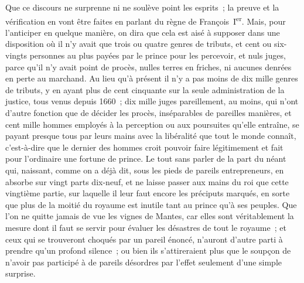 \documentclass[french,twoside]{book} %
\begin{document}
Que ce discours ne surprenne ni ne soulève point les esprits ; la preuve et la vérification en vont être faites en parlant du règne de François I\textsuperscript{er}. Mais, pour l’anticiper en quelque manière, on dira que cela est aisé à supposer dans une disposition où il n’y avait que trois ou quatre genres de tributs, et cent ou six-vingts personnes au plus payées par le prince pour les percevoir, et nuls juges, parce qu’il n’y avait point de procès, nulles terres en friches, ni aucunes denrées en perte au marchand. Au lieu qu’à présent il n’y a pas moins de dix mille genres de tributs, y en ayant plus de cent cinquante sur la seule administration de la justice, tous venus depuis 1660 ; dix mille juges pareillement, au moins, qui n’ont d’autre fonction que de décider les procès, inséparables de pareilles manières, et cent mille hommes employés à la perception ou aux poursuites qu’elle entraîne, se payant presque tous par leurs mains avec la libéralité que tout le monde connaît, c’est-à-dire que le dernier des hommes croit pouvoir faire légitimement et fait pour l’ordinaire une fortune de prince. Le tout sans parler de la part du néant qui, naissant, comme on a déjà dit, sous les pieds de pareils entrepreneurs, en absorbe sur vingt parts dix-neuf, et ne laisse passer aux mains du roi que cette vingtième partie, sur laquelle il leur faut encore les préciputs marqués, en sorte que plus de la moitié du royaume est inutile tant au prince qu’à ses peuples. Que l’on ne quitte jamais de vue les vignes de Mantes, car elles sont véritablement la mesure dont il faut se servir pour évaluer les désastres de tout le royaume ; et ceux qui se trouveront choqués par un pareil énoncé, n’auront d’autre parti à prendre qu’un profond silence ; ou bien ils s’attireraient plus que le soupçon de n’avoir pas participé à de pareils désordres par l’effet seulement d’une simple surprise.\par
\end{document}
